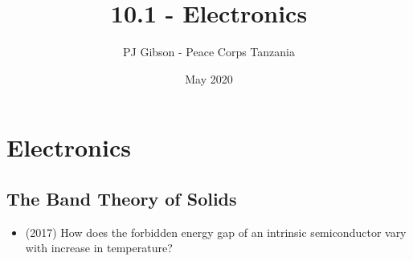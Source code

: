 \documentclass{article}
\title{10.1 - Electronics}
\author{PJ Gibson - Peace Corps Tanzania}
\date{May 2020}
\begin{document}
\maketitle


\section{Electronics}

\subsection{The Band Theory of Solids}
\begin{itemize}
\item (2017)  How does the forbidden energy gap of an intrinsic semiconductor vary with increase in temperature? 
\end{itemize}
\end{document}

